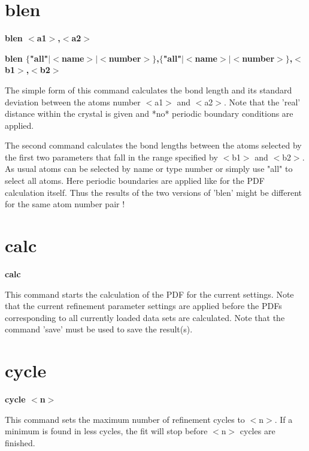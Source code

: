 \section{blen}
{\bf blen $ <$a1$> $,$ <$a2$> $ \par }
{\bf blen $ \{$"all"$| $$ <$name$> $$| $$ <$number$> $$\} $,$ \{$"all"$| $$ <$name$> $$| $$ <$number$> $$\} $,$ <$b1$> $,$ <$b2$> $ \par }
\par
\vspace{3pt}
The simple form of this command calculates the bond length and its 
standard deviation between the atoms number $ <$a1$> $ and $ <$a2$> $. Note 
that the 'real' distance within the crystal is given and *no* 
periodic boundary conditions are applied. 
\par
The second command calculates the bond lengths between the atoms selected 
by the first two parameters that fall in the range specified by 
$ <$b1$> $ and $ <$b2$> $. As usual atoms can be selected by name or type number 
or simply use "all" to select all atoms. Here periodic boundaries 
are applied like for the PDF calculation itself. Thus the results 
of the two versions of 'blen' might be different for the same atom 
number pair ! 
\section{calc}
{\bf calc \par }
\par
\vspace{3pt}
This command starts the calculation of the PDF for the current 
settings. Note that the current refinement parameter settings are 
applied before the PDFs corresponding to all currently loaded data 
sets are calculated. Note that the command 'save' must be used 
to save the result(s). 
\section{cycle}
{\bf cycle $ <$n$> $ \par }
\par
\vspace{3pt}
This command sets the maximum number of refinement cycles to $ <$n$> $. 
If a minimum is found in less cycles, the fit will stop before $ <$n$> $ 
cycles are finished. 
